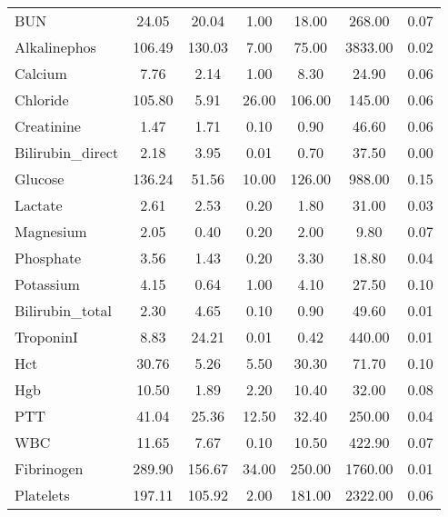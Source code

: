 \begin{longtable}{lcccccc}
BUN              &  24.05 &              20.04 &     1.00 &  18.00 &  268.00 &            0.07 \\
Alkalinephos     & 106.49 &             130.03 &     7.00 &  75.00 & 3833.00 &            0.02 \\
Calcium          &   7.76 &               2.14 &     1.00 &   8.30 &   24.90 &            0.06 \\
Chloride         & 105.80 &               5.91 &    26.00 & 106.00 &  145.00 &            0.06 \\
Creatinine       &   1.47 &               1.71 &     0.10 &   0.90 &   46.60 &            0.06 \\
Bilirubin\_direct &   2.18 &               3.95 &     0.01 &   0.70 &   37.50 &            0.00 \\
Glucose          & 136.24 &              51.56 &    10.00 & 126.00 &  988.00 &            0.15 \\
Lactate          &   2.61 &               2.53 &     0.20 &   1.80 &   31.00 &            0.03 \\
Magnesium        &   2.05 &               0.40 &     0.20 &   2.00 &    9.80 &            0.07 \\
Phosphate        &   3.56 &               1.43 &     0.20 &   3.30 &   18.80 &            0.04 \\
Potassium        &   4.15 &               0.64 &     1.00 &   4.10 &   27.50 &            0.10 \\
Bilirubin\_total  &   2.30 &               4.65 &     0.10 &   0.90 &   49.60 &            0.01 \\
TroponinI        &   8.83 &              24.21 &     0.01 &   0.42 &  440.00 &            0.01 \\
Hct              &  30.76 &               5.26 &     5.50 &  30.30 &   71.70 &            0.10 \\
Hgb              &  10.50 &               1.89 &     2.20 &  10.40 &   32.00 &            0.08 \\
PTT              &  41.04 &              25.36 &    12.50 &  32.40 &  250.00 &            0.04 \\
WBC              &  11.65 &               7.67 &     0.10 &  10.50 &  422.90 &            0.07 \\
Fibrinogen       & 289.90 &             156.67 &    34.00 & 250.00 & 1760.00 &            0.01 \\
Platelets        & 197.11 &             105.92 &     2.00 & 181.00 & 2322.00 &            0.06 \\

\end{longtable}
